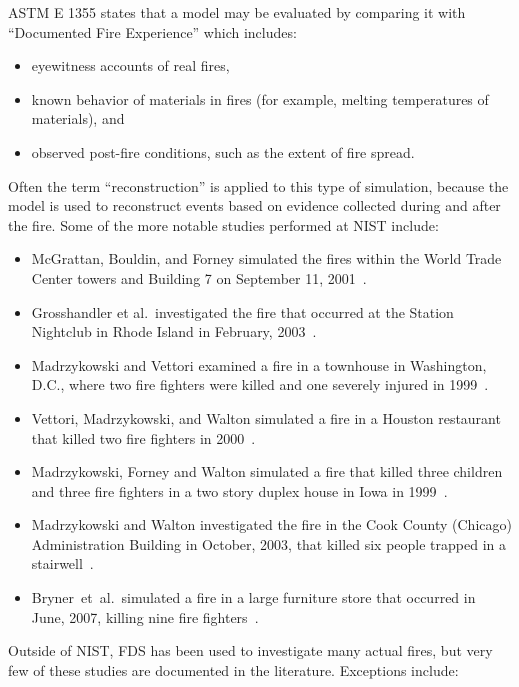 ASTM E 1355 states that a model may be evaluated by comparing it with ``Documented Fire Experience'' which includes:
\begin{itemize}
\item eyewitness accounts of real fires,
\item known behavior of materials in fires (for example, melting temperatures of materials), and
\item observed post-fire conditions, such as the extent of fire spread.
\end{itemize}
Often the term ``reconstruction'' is applied to this type of simulation, because the model is used to reconstruct events based on evidence collected during and after the fire. Some of the more notable studies performed at NIST include:
\begin{itemize}
\item McGrattan, Bouldin, and Forney simulated the fires within the World Trade Center towers and Building 7 on September 11, 2001~\cite{NIST_NCSTAR_1-5F}.
\item Grosshandler et al.~investigated the fire that occurred at the Station Nightclub in Rhode Island in February, 2003~\cite{Grosshandler:Station}.
\item Madrzykowski and Vettori examined a fire in a townhouse in Washington, D.C., where two fire fighters were killed and one severely injured in 1999~\cite{Madrzykowski:1}.
\item Vettori, Madrzykowski, and Walton simulated a fire in a Houston restaurant that killed two fire fighters in 2000~\cite{Texas}.
\item Madrzykowski, Forney and Walton simulated a fire that killed three children and three fire fighters in a two story duplex house in Iowa in 1999~\cite{Iowa}.
\item Madrzykowski and Walton investigated the fire in the Cook County (Chicago) Administration Building in October, 2003, that killed six people trapped in a stairwell~\cite{Cook_County}.
\item Bryner~et~al.~simulated a fire in a large furniture store that occurred in June, 2007, killing nine fire fighters~\cite{Bryner:Charleston}.
\end{itemize}
Outside of NIST, FDS has been used to investigate many actual fires, but very few of these studies are documented in the literature. Exceptions
include:
